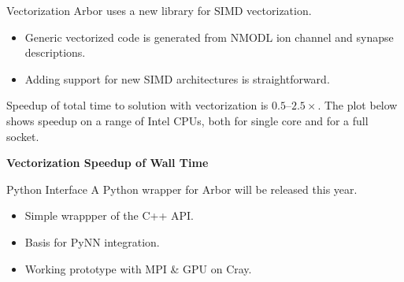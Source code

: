 \documentclass[a0paper,portrait]{baposter}
\newcommand{\arborname}{Arbor\xspace}
\newcommand{\arbor}{{\textcolor{blue!30!black}{\arborname}}\xspace}
\newcommand{\imageheader}[1]{\begin{center}\bfseries\large{#1}\end{center} \vspace{-2pt}}
\newcommand{\newemph}[1]{{\color{emph}#1}}
\begin{document}
\begin{poster}
\begin{posterbox}[name=vector,column=0,below=progress,span=1]{Vectorization}
    \arbor uses a new library for SIMD vectorization.

    \begin{itemize}
        \item Generic vectorized code is generated from NMODL ion channel and synapse descriptions.
        \item Adding support for new SIMD architectures is straightforward.
    \end{itemize}

    Speedup of \newemph{total time to solution} with vectorization is $0.5$--$2.5\times$.
    The plot below shows speedup on a range of Intel CPUs, both for single core and for a full socket.

    \vspace{-1pt}
    \imageheader{Vectorization Speedup of Wall Time}

    \vspace{-1pt}
\end{posterbox}

\begin{posterbox}[name=python,column=1,below=motivation,span=1]{Python Interface}
    A Python wrapper for \arbor will be released this year.
    \begin{itemize}
        \item Simple wrappper of the C++ API.
        \item Basis for PyNN integration.
        \item Working prototype with MPI \& GPU on Cray.
    \end{itemize}


\end{posterbox}
\end{poster}
\end{document}
